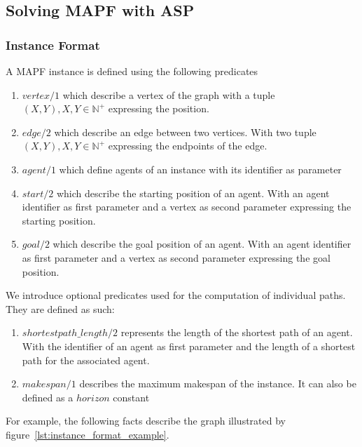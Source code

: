 \subsection{Solving MAPF with ASP}

\subsubsection{Instance Format}

A MAPF instance is defined using the following predicates

\begin{enumerate}
    \label{list:instance_format_explanation_part1}
    \item \(vertex/1\) which describe a vertex of the graph with a tuple \((X,Y), X,Y \in \mathbb{N}^+\) expressing the position.
    \item \(edge/2\) which describe an edge between two vertices. With two tuple \((X,Y), X,Y \in \mathbb{N}^+\) expressing the endpoints of the edge.
    \item \(agent/1\) which define agents of an instance with its identifier as parameter
    \item \(start/2\) which describe the starting position of an agent. With an agent identifier as first parameter and a vertex as second parameter expressing the starting position.
    \item \(goal/2\) which describe the goal position of an agent. With an agent identifier as first parameter and a vertex as second parameter expressing the goal position. 
\end{enumerate}

We introduce optional predicates used for the computation of individual paths. They are defined as such:

\begin{enumerate}
    \label{list:instance_format_explanation_part2}
    \item \(shortestpath\_length/2\)  represents the length of the shortest path of an agent. With the identifier of an agent as first parameter and the length of a shortest path for the associated agent.
    \item \(makespan/1\)  describes the maximum makespan of the instance. It can also be defined as a \(horizon\) constant
\end{enumerate}

For example, the following facts describe the graph illustrated by figure~\ref{lst:instance_format_example}.

